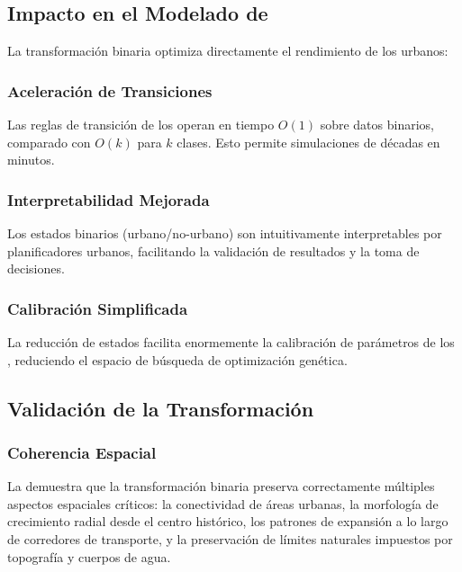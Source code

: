 \subsection{Impacto en el Modelado de \AC{}}

La transformación binaria optimiza directamente el rendimiento de los \AC{} urbanos:

\subsubsection{Aceleración de Transiciones}

Las reglas de transición de los \AC{} operan en tiempo $O(1)$ sobre datos binarios, comparado con $O(k)$ para $k$ clases. Esto permite simulaciones de décadas en minutos.

\subsubsection{Interpretabilidad Mejorada}

Los estados binarios (urbano/no-urbano) son intuitivamente interpretables por planificadores urbanos, facilitando la validación de resultados y la toma de decisiones.

\subsubsection{Calibración Simplificada}

La reducción de estados facilita enormemente la calibración de parámetros de los \AC{}, reduciendo el espacio de búsqueda de optimización genética.

\subsection{Validación de la Transformación}

\subsubsection{Coherencia Espacial}

La  demuestra que la transformación binaria preserva correctamente múltiples aspectos espaciales críticos: la conectividad de áreas urbanas, la morfología de crecimiento radial desde el centro histórico, los patrones de expansión a lo largo de corredores de transporte, y la preservación de límites naturales impuestos por topografía y cuerpos de agua.

